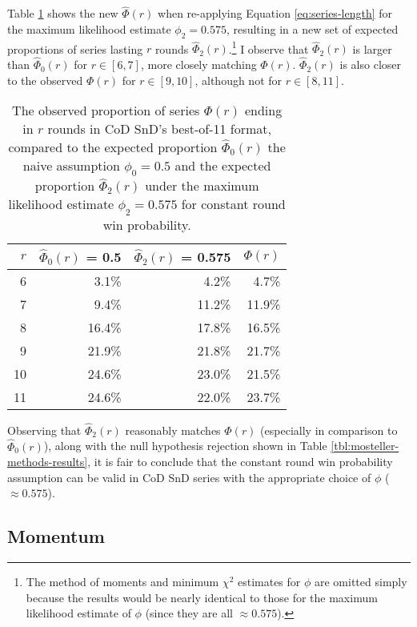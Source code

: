 \documentclass{article}
\begin{document}
Table \ref{tbl:expected-series-lengths-alternative-ps} shows the new
\(\hat{\Phi}(r)\) when re-applying Equation \ref{eq:series-length} for
the maximum likelihood estimate \(\phi_2 = 0.575\), resulting in a new
set of expected proportions of series lasting \(r\) rounds
\(\hat{\Phi}_2(r)\).\footnote{The method of moments and minimum
  \(\chi^2\) estimates for \(\phi\) are omitted simply because the
  results would be nearly identical to those for the maximum likelihood
  estimate of \(\phi\) (since they are all \(\approx 0.575\)).} I
observe that \(\hat{\Phi}_2(r)\) is larger than \(\hat{\Phi}_0(r)\) for
\(r \in [6, 7]\), more closely matching \(\Phi(r)\). \(\hat{\Phi}_2(r)\)
is also closer to the observed \(\Phi(r)\) for \(r \in [9, 10]\),
although not for \(r \in [8, 11]\).

\begin{longtable}[]{@{}rrrr@{}}
\caption{The observed proportion of series $\Phi(r)$ ending in $r$ rounds in CoD SnD's best-of-11 format, compared to the expected proportion $\hat{\Phi}_0(r)$ the naive assumption $\phi_0 = 0.5$ and the expected proportion $\hat{\Phi}_2(r)$ under the maximum likelihood estimate $\phi_2 = 0.575$ for constant round win probability.}\label{tbl:expected-series-lengths-alternative-ps} \\
\toprule()
$r$ & $\hat{\Phi}_0(r)$ = 0.5 & $\hat{\Phi}_2(r)$ = 0.575 & $\Phi(r)$ \\
\midrule()
\endhead
6 & 3.1\% & 4.2\% & 4.7\% \\
7 & 9.4\% & 11.2\% & 11.9\% \\
8 & 16.4\% & 17.8\% & 16.5\% \\
9 & 21.9\% & 21.8\% & 21.7\% \\
10 & 24.6\% & 23.0\% & 21.5\% \\
11 & 24.6\% & 22.0\% & 23.7\% \\
\bottomrule()
\end{longtable}

Observing that \(\hat{\Phi}_2(r)\) reasonably matches \(\Phi(r)\)
(especially in comparison to \(\hat{\Phi}_0(r)\)), along with the null
hypothesis rejection shown in Table \ref{tbl:mosteller-methods-results},
it is fair to conclude that the constant round win probability
assumption can be valid in CoD SnD series with the appropriate choice of
\(\phi\) (\(\approx 0.575\)).

\hypertarget{momentum-1}{%
\subsection{Momentum}\label{momentum-1}}
\end{document}
